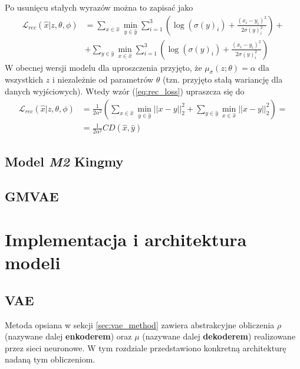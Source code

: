 \documentclass[12pt]{extarticle}
\begin{document}
Po usunięcu stałych wyrazów można to zapisać jako
\begin{equation}
\begin{split}
\mathcal{L}_{rec}(\hat{x}|z,\theta,\phi) &= \sum_{x \in \hat{x}} \min_{y \in \hat{y}} \sum_{i=1}^3
\left( \log(\sigma(y)_i) + \frac{(x_i-y_i)^2}{2\sigma(y)_i^2} \right) +\\
&+ \sum_{y \in \hat{y}} \min_{x \in \hat{x}} \sum_{i=1}^3
\left( \log(\sigma(y)_i) + \frac{(x_i-y_i)^2}{2\sigma(y)_i^2} \right)
\end{split}
\label{eq:rec_loss}
\end{equation}
W obecnej wersji modelu dla uproszczenia przyjęto, że $\mu_\sigma(z;\theta) = \alpha$
dla wszystkich $z$ i niezależnie od parametrów $\theta$ (tzn. przyjęto stałą wariancję dla
danych wyjściowych). Wtedy wzór (\ref{eq:rec_loss}) upraszcza się do
\begin{equation}
\begin{split}
\mathcal{L}_{rec}(\hat{x}|z,\theta,\phi) &= \frac{1}{2\alpha^2} \left(
\sum_{x \in \hat{x}} \min_{y \in \hat{y}} ||x-y||_2^2 +
\sum_{y \in \hat{y}} \min_{x \in \hat{x}} ||x-y||_2^2 \right) = \\
&= \frac{1}{2\alpha^2} CD(\hat{x}, \hat{y})
\end{split}
\end{equation}

\subsection{Model \textit{M2} Kingmy}
\subsection{GMVAE}

\section{Implementacja i architektura modeli}

\subsection{VAE}
Metoda opsiana w sekcji \ref{sec:vae_method} zawiera abstrakcyjne obliczenia $\rho$
(nazywane dalej \textbf{enkoderem}) oraz $\mu$ (nazywane dalej \textbf{dekoderem}) realizowane przez
sieci neuronowe. W tym rozdziale przedstawiono konkretną architekturę nadaną tym obliczeniom.
\end{document}
